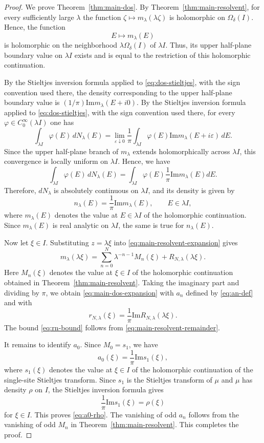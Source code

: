 \documentclass[a4paper,11pt]{article}
\newcommand{\Impart}{\mathrm{Im}}
\begin{document}
\begin{proof}
We prove Theorem~\ref{thm:main-dos}.
By Theorem~\ref{thm:main-resolvent}, for every sufficiently large $\lambda$ the function
$\zeta\mapsto m_\lambda(\lambda\zeta)$ is holomorphic on $\Omega_\delta(I)$.
Hence, the function
$$
E\mapsto m_\lambda(E)
$$
is holomorphic on the neighborhood $\lambda\Omega_\delta(I)$ of $\lambda I$.
Thus, its upper half-plane boundary value on $\lambda I$
exists and is equal to the restriction of this holomorphic continuation.

By the Stieltjes inversion formula applied to \eqref{eq:dos-stieltjes}, 
with the sign convention used there, the
density corresponding to the upper half-plane boundary value is
$(1/\pi)\Impart m_\lambda(E+i0)$. 
By the Stieltjes inversion formula applied to
\eqref{eq:dos-stieltjes}, with the sign convention used there, for every
$\varphi\in C_0^\infty(\lambda I)$ one has
$$
\int_{\lambda I}\varphi(E)\,dN_\lambda(E)
=
\lim_{\varepsilon\downarrow0}\frac{1}{\pi}\int_{\lambda I}
\varphi(E)\Impart m_\lambda(E+i\varepsilon)\,dE .
$$
Since the upper half-plane branch of $m_\lambda$ extends holomorphically
across $\lambda I$, this convergence is locally uniform on $\lambda I$.
Hence, we have
$$
\int_{\lambda I}\varphi(E)\,dN_\lambda(E)
=
\int_{\lambda I}
\varphi(E)\frac{1}{\pi}\Impart m_\lambda(E)dE.
$$
Therefore, $dN_\lambda$ is absolutely continuous on $\lambda I$, 
and its density is given by
\begin{equation}
\label{eq:density-boundary}
n_\lambda(E)=\frac{1}{\pi}\Impart m_\lambda(E),\qquad E\in\lambda I,
\end{equation}
where $m_\lambda(E)$ denotes the value at $E\in\lambda I$ of the holomorphic continuation. 
Since $m_\lambda(E)$ is real analytic on $\lambda I$, the same is true for $n_\lambda(E)$.

Now let $\xi\in I$. Substituting $z=\lambda\xi$ into \eqref{eq:main-resolvent-expansion} gives
\begin{equation}
\label{eq:boundary-at-xi}
m_\lambda(\lambda\xi)=\sum_{n=0}^{N}\lambda^{-n-1}M_n(\xi)
+R_{N,\lambda}(\lambda\xi).
\end{equation}
Here $M_n(\xi)$ denotes the value at $\xi\in I$ of the holomorphic
continuation obtained in Theorem~\ref{thm:main-resolvent}. 
Taking the imaginary part and dividing by $\pi$, we obtain
\eqref{eq:main-dos-expansion} with $a_n$ defined by \eqref{eq:an-def} and with
$$
r_{N,\lambda}(\xi)=\frac{1}{\pi}\Impart R_{N,\lambda}(\lambda\xi).
$$
The bound \eqref{eq:rn-bound} follows from \eqref{eq:main-resolvent-remainder}.

It remains to identify $a_0$. 
Since $M_0=s_1$, we have
$$
a_0(\xi)=\frac{1}{\pi}\Impart s_1(\xi),
$$
where $s_1(\xi)$ denotes the value at $\xi\in I$ of the holomorphic
continuation of the single-site Stieltjes transform. 
Since $s_1$ is the Stieltjes transform of $\mu$ and $\mu$ has density $\rho$ on $I$, 
the Stieltjes inversion formula gives
$$
\frac{1}{\pi}\Impart s_1(\xi)=\rho(\xi)
$$
for $\xi\in I$. 
This proves \eqref{eq:a0-rho}. 
The vanishing of odd $a_n$ follows from the vanishing of odd $M_n$ in Theorem~\ref{thm:main-resolvent}.
This completes the proof.
\end{proof}
\end{document}
